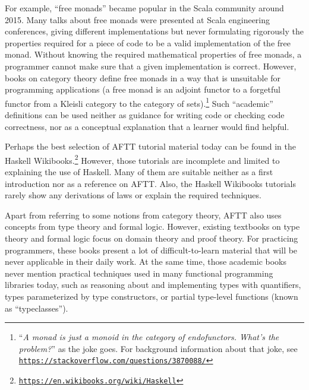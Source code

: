 For example, \textsf{``}free monads\textsf{''} became popular in the Scala community
around 2015. Many talks about free monads were presented at Scala
engineering conferences, giving different implementations but never
formulating rigorously the properties required for a piece of code
to be a valid implementation of the free monad. Without knowing the
required mathematical properties of free monads, a programmer cannot
make sure that a given implementation is correct. However, books on
category theory define free monads in a way that is unsuitable for
programming applications (a free monad is an adjoint functor to a
forgetful functor from a Kleisli category to the category of sets).\footnote{\textsf{``}\emph{A monad is just a monoid in the category of endofunctors.
What\textsf{'}s the problem?}\textsf{''} as the joke goes. For background information
about that joke, see \texttt{\href{https://stackoverflow.com/questions/3870088/}{https://stackoverflow.com/questions/3870088/}}} Such \textsf{``}academic\textsf{''} definitions can be used neither as guidance for
writing code or checking code correctness, nor as a conceptual explanation
that a learner would find helpful.

Perhaps the best selection of AFTT tutorial material today can be
found in the Haskell Wikibooks.\footnote{\texttt{\href{https://en.wikibooks.org/wiki/Haskell}{https://en.wikibooks.org/wiki/Haskell}}}
However, those tutorials are incomplete and limited to explaining
the use of Haskell. Many of them are suitable neither as a first introduction
nor as a reference on AFTT. Also, the Haskell Wikibooks tutorials
rarely show any derivations of laws or explain the required techniques.

Apart from referring to some notions from category theory, AFTT also
uses concepts from type theory and formal logic. However, existing
textbooks on type theory and formal logic focus on domain theory and
proof theory. For practicing programmers, these books present a lot
of difficult-to-learn material that will be never applicable in their
daily work. At the same time, those academic books never mention practical
techniques used in many functional programming libraries today, such
as reasoning about and implementing types with quantifiers, types
parameterized by type constructors, or partial type-level functions
(known as \textsf{``}typeclasses\textsf{''}).

